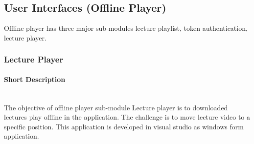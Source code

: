 \documentclass[12pt]{article}
\begin{document}
%
%
%
%
%

\newpage
\subsection{User Interfaces (Offline Player)}
Offline player has three major sub-modules lecture playlist, token authentication, lecture player.
\subsubsection{Lecture Player}

\paragraph{Short Description}\mbox{}\\
The objective of offline player sub-module Lecture player is to downloaded lectures play offline in the application. The challenge is to move lecture video to a specific position. This application is developed in visual studio as windows form application.
\end{document}
